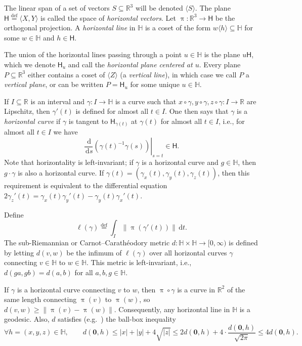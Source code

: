\documentclass[11pt,reqno]{amsart}
\renewcommand{\H}{\mathbb{H}}
\newcommand{\R}{\mathbb{R}}
\newcommand{\ud}[0]{\,\mathrm{d}}
\newcommand{\0}{\mathbf{0}}
\renewcommand{\1}{\mathbf 1}
\newcommand{\from}{\colon}
\renewcommand{\subset}{\subseteq}
\newcommand{\eqdef}{\stackrel{\mathrm{def}}{=}}
\renewcommand{\ge}{\geqslant}
\renewcommand{\le}{\leqslant}
\theoremstyle{remark}
\begin{document}
The linear span of a set of vectors $S\subset \R^3$ will be denoted $\langle S\rangle$. The plane $\mathsf{H}\eqdef \langle X,Y\rangle$ is called the space of \emph{horizontal vectors}.  Let $\uppi\from \R^3\to \mathsf{H}$ be the orthogonal projection.  A \emph{horizontal line} in $\H$ is a coset of the form $w\langle h\rangle\subset \H$ for some $w\in \H$ and $h\in \mathsf{H}$.  %

The union of the horizontal lines passing through a point $u\in \H$ is the  plane $u\mathsf{H}$, which we denote $\mathsf{H}_u$ and call the \emph{horizontal plane centered at $u$}.  Every plane $P\subset \R^3$ either contains a coset of $\langle Z\rangle$ (a \emph{vertical line}), in which case we call $P$ a \emph{vertical plane}, or can be written $P=\mathsf{H}_u$ for some unique $u\in \H$.

If $I\subset \R$ is an interval and $\gamma\from I\to \H$ is a curve such that $x\circ \gamma, y\circ \gamma, z\circ\gamma\from I\to \R$ are  Lipschitz, then $\gamma'(t)$ is defined for almost all $t\in I$.  One then says that $\gamma$ is a \emph{horizontal curve} if $\gamma$ is tangent to $\mathsf{H}_{\gamma(t)}$ at $\gamma(t)$ for almost all $t\in I$, i.e., for almost all $t\in I$ we have
$$
\left.\frac{\ud}{\ud s} \left(\gamma(t)^{-1}\gamma(s)\right)\right|_{s=t}\in \mathsf{H}.
$$
Note that horizontality is left-invariant; if $\gamma$ is a horizontal curve and $g\in \H$, then $g\cdot \gamma$ is also a horizontal curve.
If $\gamma(t)=(\gamma_x(t),\gamma_y(t),\gamma_z(t))$, then this requirement  is equivalent to the differential equation $2\gamma_z'(t)=\gamma_x(t)\gamma_y'(t)-\gamma_y(t)\gamma_x'(t)$.

Define
$$\ell(\gamma)\eqdef \int_I \|\uppi(\gamma'(t))\|\ud t.$$
The sub-Riemannian or Carnot--Carath\'eodory metric $d\from \H\times \H\to [0,\infty)$ is defined by letting $d(v,w)$ be the infimum of $\ell(\gamma)$ over all horizontal curves $\gamma$ connecting $v\in \H$ to $w\in \H$.  This metric is left-invariant, i.e., $d(ga,gb)=d(a,b)$ for all $a,b,g\in \H$.

If $\gamma$ is a horizontal curve connecting $v$ to $w$, then $\uppi\circ \gamma$ is a curve in $\R^2$ of the same length connecting $\uppi(v)$ to $\uppi(w)$, so $d(v,w)\ge \|\uppi(v)-\uppi(w)\|$.  Consequently, any horizontal line in $\H$ is a geodesic.  Also, $d$ satisfies (e.g.~\cite{BR96,Gro96,Mon02}) the ball-box inequality
\begin{equation}
  \label{eq:metric approximation}
  \forall  h=(x,y,z)\in \H,\qquad   d(\0,h) \le |x|+ |y|+4\sqrt{|z|} \le 2 d(\0,h)  + 4\cdot \frac{d(\0,h)}{\sqrt{2\pi}} \le 4 d(\0,h).
\end{equation}
\end{document}
